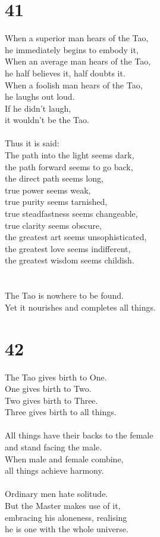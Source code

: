 \documentclass[b5paper, 12pt, oneside]{book}
\begin{document}
\chapter*{41}
When a superior man hears of the Tao,\\
he immediately begins to embody it,\\
When an average man hears of the Tao,\\
he half believes it, half doubts it.\\
When a foolish man hears of the Tao,\\
he laughs out loud.\\
If he didn't laugh,\\
it wouldn't be the Tao.\\
\\
Thus it is said:\\
The path into the light seems dark,\\
the path forward seems to go back,\\
the direct path seems long,\\
true power seems weak,\\
true purity seems tarnished,\\
true steadfastness seems changeable,\\
true clarity seems obscure,\\
the greatest art seems unsophisticated,\\
the greatest love seems indifferent,\\
the greatest wisdom seems childish.\\
\\
\\
The Tao is nowhere to be found.\\
Yet it nourishes and completes all things.\\

\chapter*{42}
The Tao gives birth to One.\\
One gives birth to Two.\\
Two gives birth to Three.\\
Three gives birth to all things.\\
\\
All things have their backs to the female\\
and stand facing the male.\\
When male and female combine,\\
all things achieve harmony.\\
\\
Ordinary men hate solitude.\\
But the Master makes use of it,\\
embracing his aloneness, realising\\
he is one with the whole universe.\\
\end{document}
